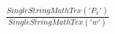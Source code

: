\documentclass[preview]{standalone}
\begin{document}
\begin{align*}
\frac{SingleStringMathTex('P_x')}{SingleStringMathTex('w')}
\end{align*}
\end{document}
